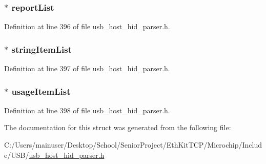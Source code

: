 \subsubsection[{report\+List}]{$\ast$ report\+List}\label{struct___u_s_b___h_i_d___i_t_e_m___l_i_s_t_a11cccc2cd432f7f02fb9cc6e7147f9a0}


Definition at line 396 of file usb\+\_\+host\+\_\+hid\+\_\+parser.\+h.

\hypertarget{struct___u_s_b___h_i_d___i_t_e_m___l_i_s_t_a44feaff25d3dd75b38ad77bee10206d6}{}
\subsubsection[{string\+Item\+List}]{$\ast$ string\+Item\+List}\label{struct___u_s_b___h_i_d___i_t_e_m___l_i_s_t_a44feaff25d3dd75b38ad77bee10206d6}


Definition at line 397 of file usb\+\_\+host\+\_\+hid\+\_\+parser.\+h.

\hypertarget{struct___u_s_b___h_i_d___i_t_e_m___l_i_s_t_a0297cd59d5ef7d0cb92461c9212f3f16}{}
\subsubsection[{usage\+Item\+List}]{$\ast$ usage\+Item\+List}\label{struct___u_s_b___h_i_d___i_t_e_m___l_i_s_t_a0297cd59d5ef7d0cb92461c9212f3f16}


Definition at line 398 of file usb\+\_\+host\+\_\+hid\+\_\+parser.\+h.



The documentation for this struct was generated from the following file\+:\begin{DoxyCompactItemize}
\item 
C\+:/\+Users/mainuser/\+Desktop/\+School/\+Senior\+Project/\+Eth\+Kit\+T\+C\+P/\+Microchip/\+Include/\+U\+S\+B/\hyperlink{usb__host__hid__parser_8h}{usb\+\_\+host\+\_\+hid\+\_\+parser.\+h}\end{DoxyCompactItemize}

